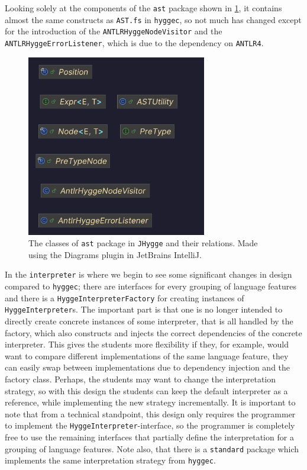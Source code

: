 Looking solely at the components of the \texttt{ast} package shown in \ref{fig:ast_classes}, it contains almost the same constructs as \texttt{AST.fs} in \texttt{hyggec}, so not much has changed
except for the introduction of the \texttt{ANTLRHyggeNodeVisitor} and the \texttt{ANTLRHyggeErrorListener}, which is due to the dependency on \texttt{ANTLR4}.

\begin{figure}[H]
\centering
\includegraphics[width=0.7\textwidth]{Pictures/Diagrams/ast_classes.png}
\caption{The classes of \texttt{ast} package in \texttt{JHygge} and their relations. Made using the Diagrams plugin in JetBrains IntelliJ.}
\label{fig:ast_classes}
\end{figure}

In the \texttt{interpreter} is where we begin to see some significant changes in design compared to \texttt{hyggec}; there are interfaces for
every grouping of language features and there is a \texttt{HyggeInterpreterFactory} for creating instances of \texttt{HyggeInterpreter}s.
The important part is that one is no longer intended to directly create concrete instances of some interpreter, that is all handled by
the factory, which also constructs and injects the correct dependencies of the concrete interpreter. This gives the students more flexibility
if they, for example, would want to compare different implementations of the same language feature, they can easily swap between implementations
due to dependency injection and the factory class. Perhaps, the students may want to change the interpretation strategy, so with this design
the students can keep the default interpreter as a reference, while implementing the new strategy incrementally. It is important to note that
from a technical standpoint, this design only requires the programmer to implement the \texttt{HyggeInterpreter}-interface, so the programmer is completely
free to use the remaining interfaces that partially define the interpretation for a grouping of language features. Note also, that there is a
\texttt{standard} package which implements the same interpretation strategy from \texttt{hyggec}.

